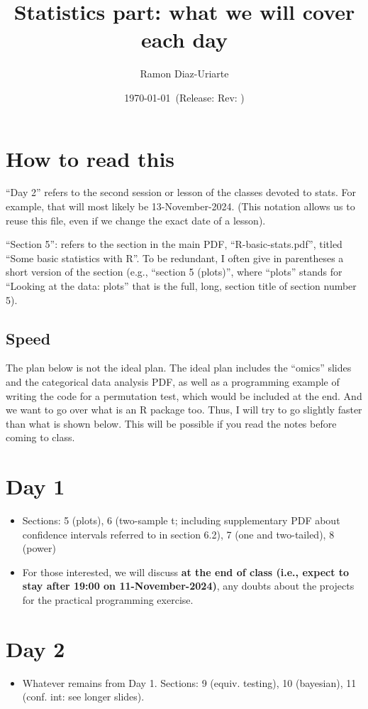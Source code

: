 \documentclass[12pt]{article}
\author{Ramon Diaz-Uriarte}
\date{\today}
\title{Statistics part: what we will cover each day}
\date{\gitAuthorDate\ {\footnotesize (Release\gitRels: Rev: \gitAbbrevHash)}}
\begin{document}
\maketitle
\section*{How to read this}
``Day 2'' refers to the second session or lesson of the classes devoted to stats. For example, that will most likely be 13-November-2024. (This notation allows us to reuse this file, even if we change the exact date of a lesson).


``Section 5'': refers to the section in the main PDF, ``R-basic-stats.pdf'', titled ``Some basic statistics with R''. To be redundant, I often give in parentheses a short version of the section (e.g., ``section 5 (plots)'', where ``plots'' stands for ``Looking at the data: plots'' that is the full, long, section title of section number 5).

\subsection*{Speed}
\label{sec:speed}

The plan below is not the ideal plan. The ideal plan includes the ``omics'' slides and the categorical data analysis PDF, as well as a programming example of writing the code for a permutation test, which would be included at the end. And we want to go over what is an R package too. Thus, I will try to go slightly faster than what is shown below. This will be possible if you read the notes before coming to class.


\section*{Day 1}
\label{sec:org21b08e0}
\begin{itemize}
\item Sections: 5 (plots), 6 (two-sample t; including supplementary PDF about confidence intervals referred to in section 6.2), 7 (one and two-tailed), 8 (power)

  \item For those interested, we will discuss \textbf{at the end of class (i.e., expect to stay after 19:00 on 11-November-2024)}, any doubts about the projects for the practical programming exercise.
\end{itemize}
\section*{Day 2}
\label{sec:org5a4c730}
\begin{itemize}
\item Whatever remains from Day 1. Sections: 9 (equiv. testing), 10 (bayesian), 11 (conf. int: see longer slides).
\end{itemize}
\end{document}
